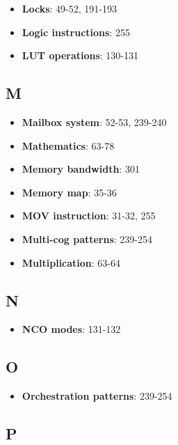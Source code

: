 \documentclass[11pt]{book}
\providecommand{\tightlist}{%
  \setlength{\itemsep}{0pt}\setlength{\parskip}{0pt}}
\begin{document}
\begin{itemize}
\tightlist
\item
  \textbf{Locks}: 49-52, 191-193
\item
  \textbf{Logic instructions}: 255
\item
  \textbf{LUT operations}: 130-131
\end{itemize}

\hypertarget{m}{%
\subsection{M}\label{m}}

\begin{itemize}
\tightlist
\item
  \textbf{Mailbox system}: 52-53, 239-240
\item
  \textbf{Mathematics}: 63-78
\item
  \textbf{Memory bandwidth}: 301
\item
  \textbf{Memory map}: 35-36
\item
  \textbf{MOV instruction}: 31-32, 255
\item
  \textbf{Multi-cog patterns}: 239-254
\item
  \textbf{Multiplication}: 63-64
\end{itemize}

\hypertarget{n}{%
\subsection{N}\label{n}}

\begin{itemize}
\tightlist
\item
  \textbf{NCO modes}: 131-132
\end{itemize}

\hypertarget{o}{%
\subsection{O}\label{o}}

\begin{itemize}
\tightlist
\item
  \textbf{Orchestration patterns}: 239-254
\end{itemize}

\hypertarget{p}{%
\subsection{P}\label{p}}
\end{document}
